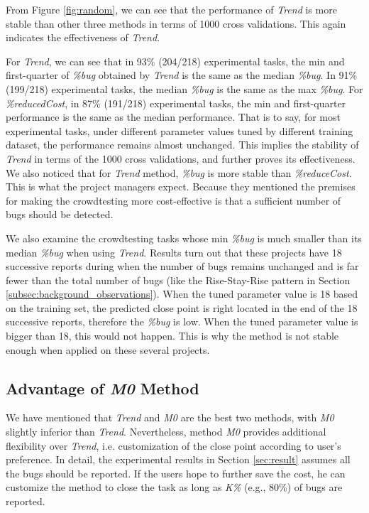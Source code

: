 \documentclass[sigconf,review, anonymous]{acmart}
\begin{document}
From Figure \ref{fig:random}, we can see that the performance of \textit{Trend} is more stable than other three methods in terms of 1000 cross validations. 
This again indicates the effectiveness of \textit{Trend}.

For \textit{Trend}, we can see that in 93\% (204/218) experimental tasks, the min and first-quarter of \textit{\%bug} obtained by \textit{Trend} is the same as the median \textit{\%bug}.
In 91\% (199/218) experimental tasks, the median \textit{\%bug} is the same as the max \textit{\%bug}.
For \textit{\%reducedCost}, in 87\% (191/218) experimental tasks, the min and first-quarter performance is the same as the median performance. 
That is to say, for most experimental tasks, under different parameter values tuned by different training dataset, the performance remains almost unchanged. 
This implies the stability of \textit{Trend} in terms of the 1000 cross validations, and further proves its effectiveness.
We also noticed that for \textit{Trend} method, \textit{\%bug} is more stable than \textit{\%reduceCost}. 
This is what the project managers expect.
Because they mentioned the premises for making the crowdtesting more cost-effective is that a sufficient number of bugs should be detected.


We also examine the crowdtesting tasks whose min \textit{\%bug} is much smaller than its median \textit{\%bug} when using \textit{Trend}.
Results turn out that these projects have 18 successive reports during when the number of bugs remains unchanged and is far fewer than the total number of bugs (like the Rise-Stay-Rise pattern in Section \ref{subsec:background_observations}). 
When the tuned parameter value is 18 based on the training set, the predicted close point is right located in the end of the 18 successive reports, therefore the \textit{\%bug} is low. 
When the tuned parameter value is bigger than 18, this would not happen. 
This is why the method is not stable enough when applied on these several projects. 




\subsection{Advantage of \textit{M0} Method}
\label{subsec:dis_advantage}

We have mentioned that \textit{Trend} and \textit{M0} are the best two methods, with \textit{M0} slightly inferior than \textit{Trend}.
Nevertheless, method \textit{M0} provides additional flexibility over \textit{Trend}, i.e. customization of the close point according to user's preference.
In detail, the experimental results in Section \ref{sec:result} assumes all the bugs should be reported.
If the users hope to further save the cost, he can customize the method to close the task as long as \textit{K\%} (e.g., 80\%) of bugs are reported.
\end{document}
